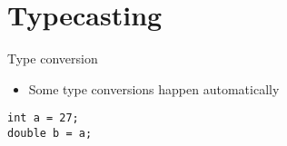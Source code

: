 \part{Typecasting}
\frame{\partpage}

\begin{frame}[fragile]{Type conversion}
    \begin{itemize}
        \item Some type conversions happen automatically
    \end{itemize}
    \begin{lstlisting}
int a = 27;
double b = a;
    \end{lstlisting}
\end{frame}
